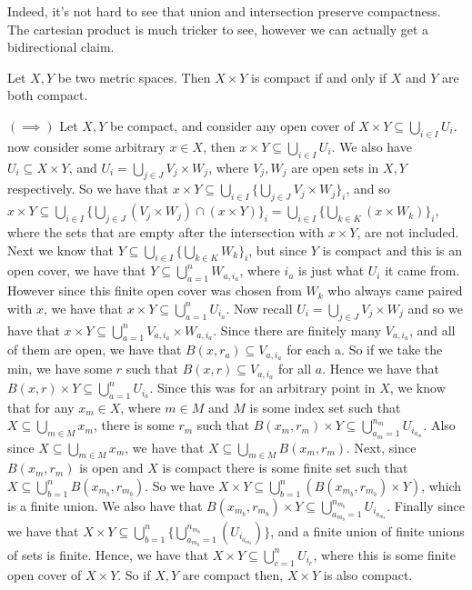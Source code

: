 Indeed, it's not hard to see that union and intersection preserve compactness.
The cartesian product is much tricker to see, however we can actually get a bidirectional claim.

\begin{lm}
    Let $ X, Y $ be two metric spaces. Then $ X \times Y $ is compact if and only if $ X $ and
    $ Y $ are both compact.
\end{lm}

\begin{pf}[source=Kirat] %
    $ (\implies) $ Let $X,Y$ be compact, and consider any open cover of $X\times Y \subseteq
    \bigcup_{i\in I} U_i$. now consider some arbitrary $x \in X$, then $x\times Y \subseteq
    \bigcup_{i\in I} U_i$. We also have $U_i \subseteq X\times Y$, and $U_i = \bigcup_{j\in J} V_j
    \times W_j$, where $V_j,W_j$ are open sets in $X,Y$ respectively. So we have that $x\times Y
    \subseteq \bigcup_{i\in I}\{\bigcup_{j\in J} V_j\times W_j\}_i$, and so $x\times Y \subseteq
    \bigcup_{i\in I}\{\bigcup_{j\in J} (V_j\times W_j)\cap (x\times Y)\}_i = \bigcup_{i\in I}
    \{\bigcup_{k\in K} (x\times W_k)\}_i$, where the sets that are empty after the intersection
    with $x\times Y$, are not included. Next we know that $Y\subseteq \bigcup_{i\in I}
    \{\bigcup_{k\in K} W_k\}_i$, but since $Y$ is compact and this is an open cover, we have that
    $Y\subseteq\bigcup_{a=1}^n W_{a,i_a}$, where $i_a$ is just what $U_i$ it came from. However
    since this finite open cover was chosen from $W_k$ who always came paired with $x$, we have
    that $x\times Y\subseteq \bigcup_{a=1}^n U_{i_a}$. \vsp
    Now recall $U_i = \bigcup_{j\in J} V_j\times W_j$ and so we have that $x\times Y\subseteq
    \bigcup_{a=1}^n V_{a,i_a}\times W_{a,i_a}$. Since there are finitely many $V_{a,i_a}$, and all 
    of them are open, we have that $B(x,r_a) \subseteq V_{a,i_a}$ for each a. So if we take the
    min, we have some $r$ such that $B(x,r) \subseteq V_{a,i_a}$ for all $a$. Hence we have that
    $B(x,r)\times Y \subseteq\bigcup_{a=1}^n U_{i_a}$. \vsp
    Since this was for an arbitrary point in $X$, we know that for any $x_m \in X$, where $m\in M$ 
    and $M$ is some index set such that $X\subseteq\bigcup_{m\in M} x_m$, there is some $r_m$ such 
    that $B(x_m,r_m)\times Y \subseteq\bigcup_{a_m=1}^{n_m} U_{i_{a_m}}$. Also since $X\subseteq
    \bigcup_{m\in M} x_m$, we have that $X\subseteq\bigcup_{m\in M} B(x_m,r_m)$. Next, since
    $B(x_m, r_m)$ is open and $X$ is compact there is some finite set such that $X\subseteq
    \bigcup_{b=1}^{n} B(x_{m_b}, r_{m_b})$. So we have $X\times Y \subseteq \bigcup_{b=1}^{n}
    (B(x_{m_b}, r_{m_b})\times Y)$, which is a finite union. We also have that $B(x_{m_b}, r_{m_b})
    \times Y\subseteq \bigcup_{a_{m_b}=1}^{n_{m_b}} U_{i_{a_{m_b}}}$. Finally since we have that
    $X\times Y \subseteq \bigcup_{b=1}^{n} \{\bigcup_{a_{m_b}=1}^{n_{m_b}} (U_{i_{a_{m_b}}})\}$,
    and a finite union of finite unions of sets is finite. Hence, we have that $X\times Y\subseteq 
    \bigcup_{c=1}^n U_{i_c}$, where this is some finite open cover of $X\times Y$. So if $X,Y$ are 
    compact then, $X\times Y$ is also compact. \npgh


\end{pf}
